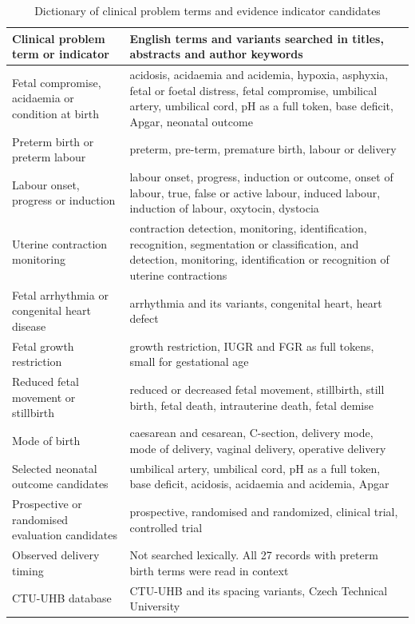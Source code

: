 \begin{table}[!ht]
\caption{Dictionary of clinical problem terms and evidence indicator candidates}
\centering
\small
\begin{tabularx}{\textwidth}{@{}L{4.6cm}Y@{}}
\toprule
Clinical problem term or indicator & English terms and variants searched in titles, abstracts and author keywords \\
\midrule
Fetal compromise, acidaemia or condition at birth & acidosis, acidaemia and acidemia, hypoxia, asphyxia, fetal or foetal distress, fetal compromise, umbilical artery, umbilical cord, pH as a full token, base deficit, Apgar, neonatal outcome \\
Preterm birth or preterm labour & preterm, pre-term, premature birth, labour or delivery \\
Labour onset, progress or induction & labour onset, progress, induction or outcome, onset of labour, true, false or active labour, induced labour, induction of labour, oxytocin, dystocia \\
Uterine contraction monitoring & contraction detection, monitoring, identification, recognition, segmentation or classification, and detection, monitoring, identification or recognition of uterine contractions \\
Fetal arrhythmia or congenital heart disease & arrhythmia and its variants, congenital heart, heart defect \\
Fetal growth restriction & growth restriction, IUGR and FGR as full tokens, small for gestational age \\
Reduced fetal movement or stillbirth & reduced or decreased fetal movement, stillbirth, still birth, fetal death, intrauterine death, fetal demise \\
Mode of birth & caesarean and cesarean, C-section, delivery mode, mode of delivery, vaginal delivery, operative delivery \\
\midrule
Selected neonatal outcome candidates & umbilical artery, umbilical cord, pH as a full token, base deficit, acidosis, acidaemia and acidemia, Apgar \\
Prospective or randomised evaluation candidates & prospective, randomised and randomized, clinical trial, controlled trial \\
Observed delivery timing & Not searched lexically. All 27 records with preterm birth terms were read in context \\
CTU-UHB database & CTU-UHB and its spacing variants, Czech Technical University \\
\bottomrule
\end{tabularx}
\end{table}

